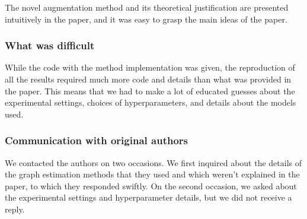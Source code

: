 The novel augmentation method and its theoretical justification are presented intuitively in the paper, and it was easy to grasp the main ideas of the paper.

\subsubsection*{What was difficult}

While the code with the method implementation was given, the reproduction of all the results required much more code and details than what was provided in the paper. This means that we had to make a lot of educated guesses about the experimental settings, choices of hyperparameters, and details about the models used. 

\subsubsection*{Communication with original authors}

We contacted the authors on two occasions. We first inquired about the details of the graph estimation methods that they used and which weren't explained in the paper, to which they responded swiftly. On the second occasion, we asked about the experimental settings and hyperparameter details, but we did not receive a reply.
